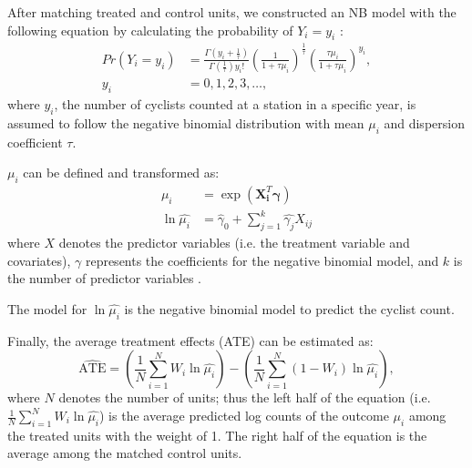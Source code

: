 \documentclass[preprint,12pt, authoryear]{elsarticle}
\begin{document}
After matching treated and control units, we constructed an NB model with the following equation by calculating the probability of \(Y_i= y_i\) :
\begin{equation}
\begin{aligned}
Pr\left(Y_i=y_i\right)&=
\frac{\Gamma\left(y_i+\frac{1}{\tau}\right)}{\Gamma\left(\frac{1}{\tau}\right) y_i!}\left(\frac{1}{1+\tau \mu_i}\right)^{\frac{1}{\tau}}\left(\frac{\tau \mu_i}{1+\tau \mu_i}\right)^{y_i}, \\
y_i&=0,1,2,3, \ldots,
\end{aligned}
\end{equation}
where \(y_i\), the number of cyclists counted at a station in a specific year, is assumed to follow the negative binomial distribution with mean \(\mu_i\) and dispersion coefficient \(\tau\).

\(\mu_i\) can be defined and transformed as:
\begin{equation}
\begin{aligned}
\mu_{i} &=\exp \left(\boldsymbol{X}_{\boldsymbol{i}}^T \boldsymbol{\gamma}\right) \\
\ln \hat{\mu_{i}} &=\hat{\gamma}_0+\sum_{j=1}^k \hat{\gamma_j} X_{i j}
\end{aligned}
\end{equation}
where \(X\) denotes the predictor variables (i.e. the treatment variable and covariates), \(\gamma\) represents the coefficients for the negative binomial model, and \(k\) is the number of predictor variables \citep{ashqar_modeling_2019}.

The model for \(\ln \hat{\mu_i}\) is the negative binomial model to predict the cyclist count.

Finally, the average treatment effects (ATE) can be estimated as:
\begin{equation}
\widehat{\mathrm{ATE}} = \left( \frac{1}{N} \sum_{i=1}^N W_i \ln \hat{\mu_{i}} \right) - \left( \frac{1}{N} \sum_{i=1}^N (1-W_i) \ln \hat{\mu_{i}} \right),
\end{equation}
where \(N\) denotes the number of units; thus the left half of the equation (i.e. \(\frac{1}{N} \sum_{i=1}^N W_i \ln \hat{\mu_{i}}\)) is the average predicted log counts of the outcome \(\mu_{i}\) among the treated units with the weight of 1.
The right half of the equation is the average among the matched control units.
\end{document}
